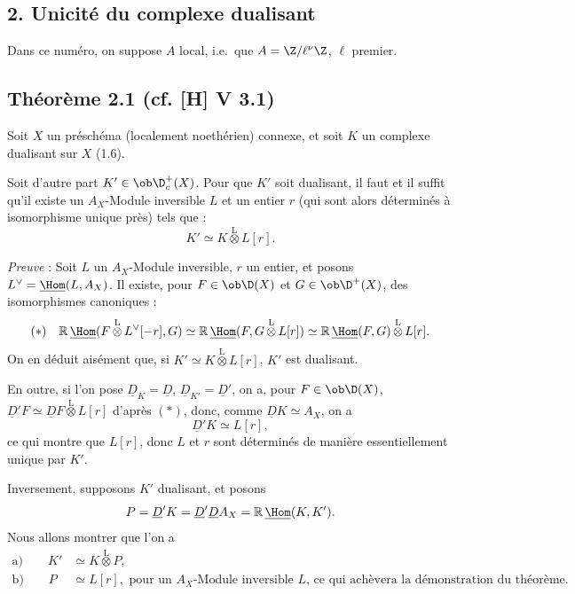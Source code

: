 \subsection*{2. Unicité du complexe dualisant}

Dans ce numéro, on suppose $A$ local, i.e.~que $A = \Z/\ell^{\nu}\Z$, $\ell$ premier.

\subsection*{Théorème 2.1 (cf. [H] V 3.1)}
Soit $X$ un préschéma (localement noethérien) connexe, et soit $K$ un complexe dualisant sur $X$ (1.6).

Soit d'autre part $K' \in \ob \D_c^{+}(X)$. Pour que $K'$ soit dualisant, il faut et il suffit qu'il existe un $A_X$-Module inversible $L$ et un entier $r$ (qui sont 
alors
déterminés à isomorphisme unique près) tels que :
\[
K' \simeq K \mathop{\otimes}\limits^{\mathrm{L}} L[r].
\]

\emph{Preuve} : Soit $L$ un $A_X$-Module inversible, $r$ un entier, et posons $L^{\vee} = \underline{\Hom}(L, A_X)$. Il existe, pour $F \in \ob \D(X)$ et $G \in \ob \D^{+}(X)$, des isomorphismes canoniques :
\[
(*) \quad \mathbb{R}\,\underline{\Hom}(F \mathop{\otimes}\limits^{\mathrm{L}} L^{\vee}[-r], G) \simeq \mathbb{R}\,\underline{\Hom}(F, G \mathop{\otimes}\limits^{\mathrm{L}} L[r]) \simeq \mathbb{R}\,\underline{\Hom}(F,G) \mathop{\otimes}\limits^{\mathrm{L}} L[r].
\]
On en déduit aisément que, si $K' \simeq K \mathop{\otimes}\limits^{\mathrm{L}} L[r]$, $K'$ est dualisant.

En outre, si l'on pose $\underline{D}_K = \underline{D}$, $\underline{D}_{K'} = \underline{D}'$, on a, pour $F \in \ob \D(X)$, $\underline{D}'F \simeq \underline{D} F \mathop{\otimes}\limits^{\mathrm{L}} L[r]$ d'après $(*)$, donc, comme $\underline{D} K \simeq A_X$, on a
\[
\underline{D}' K \simeq L[r],
\]
ce qui montre que $L[r]$, donc $L$ et $r$ sont déterminés de manière essentiellement unique par $K'$.

Inversement, supposons $K'$ dualisant, et posons
\[
P = \underline{D}'K = \underline{D}'\underline{D} A_X = \mathbb{R}\,\underline{\Hom}(K,K').
\]
Nous allons montrer que l'on a
\begin{align*}
\text{a)} \qquad K' &\simeq K \mathop{\otimes}\limits^{\mathrm{L}} P, \\
\text{b)} \qquad P &\simeq L[r], \text{ pour un $A_X$-Module inversible $L$, ce qui achèvera la démonstration du théorème.}
\end{align*}

